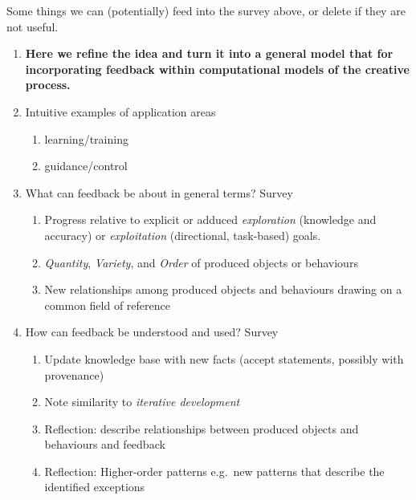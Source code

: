 \documentclass[letter]{article}
\newcommand{\dec}[1]{\raisebox{.2ex}{$\star$}#1\raisebox{.2ex}{$\star$}}
\begin{document}
\begin{mdframed}
{\large Some things we can (potentially) feed into the survey above,
  or delete if they are not useful.}

\begin{enumerate}[start=2]
\item \textbf{Here we refine the idea and turn it into a general model
  that for incorporating feedback within computational models of the
  creative process.}
\item[] Intuitive examples of application areas
\begin{enumerate}
\item learning/training
\item guidance/control
\end{enumerate}
\item[] What can feedback be about in general terms? \dec{Survey}
\begin{enumerate}
\item Progress relative to explicit or adduced \emph{exploration}
  (knowledge and accuracy) or \emph{exploitation} (directional,
  task-based) goals.
\item \emph{Quantity}, \emph{Variety}, and \emph{Order} of produced
  objects or behaviours
\item New relationships among produced objects and behaviours drawing
  on a common field of reference
\end{enumerate}
\item[] How can feedback be understood and used? \dec{Survey}
\begin{enumerate}
\item Update knowledge base with new facts (accept statements,
  possibly with provenance)
\item Note similarity to \emph{iterative development}
\item Reflection: describe relationships between produced objects and
  behaviours and feedback
\item Reflection: Higher-order patterns e.g.~new patterns that
  describe the identified exceptions
\end{enumerate}
\end{enumerate}


\end{mdframed}
\end{document}
